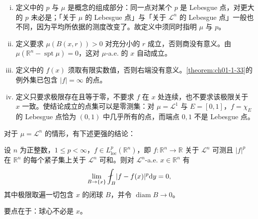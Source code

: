 \documentclass[../../main.tex]{subfiles}%
\begin{document}
\begin{remark}\label{remark:ch01-def-1-24-b-b}
\begin{enumerate}[(i)]
\item 定义中的 $p$ 与 $\mu$ 是概念的组成部分：同一点对某个 $p$ 是 Lebesgue 点，对更大的 $p$ 未必是；「关于 $\mu$ 的 Lebesgue 点」与「关于 $\mathcal{L}^{n}$ 的 Lebesgue 点」一般也不同，因为平均所依据的测度改变了。故定义中须同时指明 $\mu$ 与 $p$。
\item 定义要求 $\mu(B(x,r))>0$ 对充分小的 $r$ 成立，否则商没有意义。由 $\mu(\mathbb{R}^n-\operatorname{spt}\mu)=0$，这对 $\mu$-a.e. 的 $x$ 自动成立。
\item 定义中的 $f(x)$ 须取有限实数值，否则右端没有意义。\cref{theorem:ch01-1-33}的例外集已包含 $\lvert f\rvert=\infty$ 的点。%
\item 定义只要求极限存在且等于零，不要求 $f$ 在 $x$ 处连续，也不要求该极限关于 $x$ 一致。使结论成立的点集可以是零测集：对 $\mu=\mathcal{L}^{1}$ 与 $E=[0,1]$，$f=\chi_{E}$ 的 Lebesgue 点恰为 $(0,1)$ 中几乎所有的点，而端点 $0,1$ 不是 Lebesgue 点。
\end{enumerate}
\end{remark}

对于 $\mu=\mathcal{L}^{n}$ 的情形，有下述更强的结论：

\begin{theorem}[非中心球的微分]\label{theorem:ch01-1-34}
设 $n$ 为正整数，$1\leqslant p<\infty$，$f\in L^{p}_{\mathrm{loc}}(\mathbb{R}^n)$，即 $f:\mathbb{R}^n\to\mathbb{R}$ 关于 $\mathcal{L}^{n}$ 可测且 $\lvert f\rvert^{p}$ 在 $\mathbb{R}^n$ 的每个紧子集上关于 $\mathcal{L}^{n}$ 可和。则对 $\mathcal{L}^{n}$-a.e. $x\in\mathbb{R}^n$ 有
\begin{align*}
\lim_{B\to\{x\}}\fint_B\lvert f-f(x)\rvert^{p}\diff y=0 ,
\end{align*}
其中极限取遍一切包含 $x$ 的闭球 $B$，并令 $\operatorname{diam}B\to0$。
\end{theorem}

要点在于：球心不必是 $x$。
\end{document}
